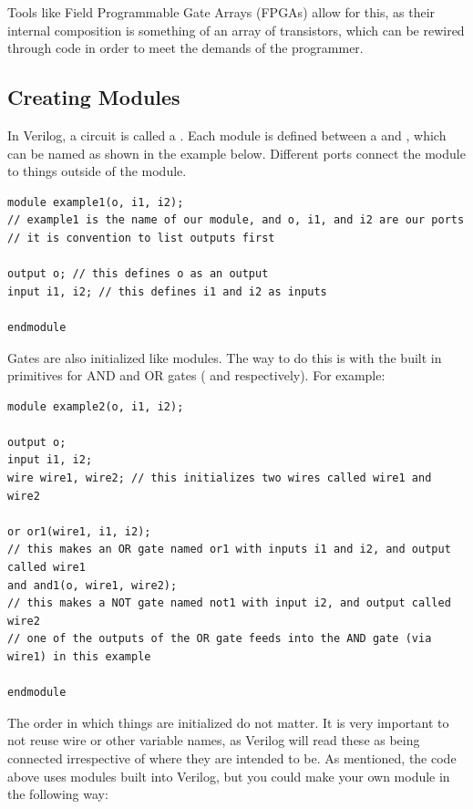 Tools like Field Programmable Gate Arrays (FPGAs) allow for this, as their internal composition is something of an array of transistors, which can be rewired through code in order to meet the demands of the programmer. 


\subsection{Creating Modules} In Verilog, a circuit is called a . Each module is defined between a  and , which can be named as shown in the example below. Different ports connect the module to things outside of the module.

\bs

\begin{lstlisting}
module example1(o, i1, i2); 
// example1 is the name of our module, and o, i1, and i2 are our ports 
// it is convention to list outputs first

output o; // this defines o as an output
input i1, i2; // this defines i1 and i2 as inputs

endmodule
\end{lstlisting}

\bs

Gates are also initialized like modules. The way to do this is with the built in primitives for AND and OR gates ( and  respectively). For example: 

\bs

\begin{lstlisting}
module example2(o, i1, i2); 

output o; 
input i1, i2; 
wire wire1, wire2; // this initializes two wires called wire1 and wire2

or or1(wire1, i1, i2); 
// this makes an OR gate named or1 with inputs i1 and i2, and output called wire1
and and1(o, wire1, wire2);
// this makes a NOT gate named not1 with input i2, and output called wire2
// one of the outputs of the OR gate feeds into the AND gate (via wire1) in this example

endmodule
\end{lstlisting}

\bs

The order in which things are initialized do not matter. It is very important to not reuse wire or other variable names, as Verilog will read these as being connected irrespective of where they are intended to be. As mentioned, the code above uses modules built into Verilog, but you could make your own module in the following way: 

